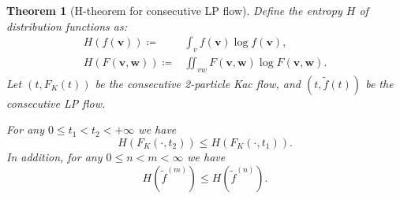 \documentclass[10pt,a4paper]{amsart}
\newtheorem{theorem}{Theorem}
\begin{document}
\begin{theorem}[H-theorem for consecutive LP flow]\label{thm:entropy}
Define the entropy $H$ of distribution functions as:
\begin{equation*}
    \begin{split}
        H(f(\mathbf{v})) \coloneqq & \int_{v} f(\mathbf{v})\log{f(\mathbf{v})},\\
        H(F(\mathbf{v},\mathbf{w})) \coloneqq & \iint_{vw} F(\mathbf{v},\mathbf{w})\log{F(\mathbf{v},\mathbf{w})}.
    \end{split}
\end{equation*}
    Let $(t, F_{K}(t))$ be the consecutive 2-particle Kac flow, and $(t, \widetilde{f}(t))$ be the consecutive LP flow. 
    
    For any $0\leq t_{1}<t_{2}<+\infty$ we have
    \begin{equation*}
            H(F_{K}(\cdot, t_{2})) \leq H(F_{K}(\cdot, t_{1})).
    \end{equation*}
    In addition, for any $0\leq n < m < \infty$ we have
    \begin{equation*}
        H(\widetilde{f}^{(m)}) \leq H(\widetilde{f}^{(n)}). 
    \end{equation*}
\end{theorem}
\end{document}
